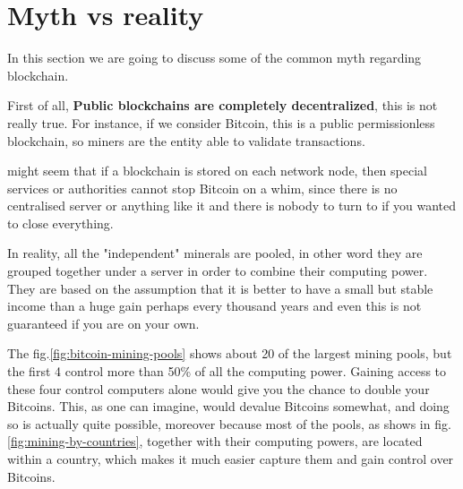 \documentclass{article}
\begin{document}
\section{Myth vs reality}
    In this section we are going to discuss some of the common myth regarding blockchain.
    
    First of all, \textbf{Public blockchains are completely decentralized}, this is not really true. For instance, if we consider Bitcoin, this is a public permissionless blockchain, so miners are the entity able to validate transactions.
    
     might seem that if a blockchain is stored on each network node, then special services or authorities cannot stop Bitcoin on a whim, since there is no centralised server or anything like it and there is nobody to turn to if you wanted to close everything.

    In reality, all the "independent" minerals are pooled, in other word they are grouped together under a server in order to combine their computing power. They are based on the assumption that it is better to have a small but stable income than a huge gain perhaps every thousand years and even this is not guaranteed if you are on your own.

    The fig.\ref{fig:bitcoin-mining-pools} shows about 20 of the largest mining pools, but the first 4 control more than 50\% of all the computing power.
    Gaining access to these four control computers alone would give you the chance to double your Bitcoins.
    This, as one can imagine, would devalue Bitcoins somewhat, and doing so is actually quite possible, moreover because most of the pools, as shows in fig.\ref{fig:mining-by-countries}, together with their computing powers, are located within a country, which makes it much easier capture them and gain control over Bitcoins.
    
\end{document}
